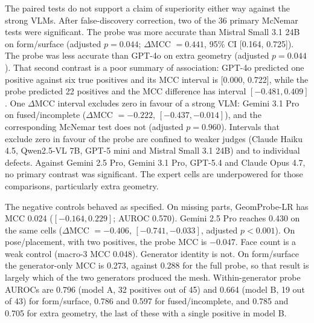 The paired tests do not support a claim of superiority either way against the strong VLMs.
After false-discovery correction, two of the 36 primary McNemar tests were significant.
The probe was more accurate than Mistral Small 3.1 24B on form/surface (adjusted \(p = 0.044\); \(\Delta\)MCC \(= 0.441\), 95\% CI [0.164, 0.725]).
The probe was less accurate than GPT-4o on extra geometry (adjusted \(p = 0.044\)).
That second contrast is a poor summary of association: GPT-4o predicted one positive against six true positives and its MCC interval is [0.000, 0.722], while the probe predicted 22 positives and the MCC difference has interval \([-0.481, 0.409]\).
One \(\Delta\)MCC interval excludes zero in favour of a strong VLM: Gemini 3.1 Pro on fused/incomplete (\(\Delta\)MCC \(= -0.222\), \([-0.437, -0.014]\)), and the corresponding McNemar test does not (adjusted \(p = 0.960\)).
Intervals that exclude zero in favour of the probe are confined to weaker judges (Claude Haiku 4.5, Qwen2.5-VL 7B, GPT-5 mini and Mistral Small 3.1 24B) and to individual defects.
Against Gemini 2.5 Pro, Gemini 3.1 Pro, GPT-5.4 and Claude Opus 4.7, no primary contrast was significant.
The expert cells are underpowered for those comparisons, particularly extra geometry.

The negative controls behaved as specified.
On missing parts, GeomProbe-LR has MCC 0.024 (\([-0.164, 0.229]\); AUROC 0.570).
Gemini 2.5 Pro reaches 0.430 on the same cells (\(\Delta\)MCC \(= -0.406\), \([-0.741, -0.033]\), adjusted \(p < 0.001\)).
On pose/placement, with two positives, the probe MCC is \(-0.047\).
Face count is a weak control (macro-3 MCC 0.048).
Generator identity is not.
On form/surface the generator-only MCC is 0.273, against 0.288 for the full probe, so that result is largely which of the two generators produced the mesh.
Within-generator probe AUROCs are 0.796 (model A, 32 positives out of 45) and 0.664 (model B, 19 out of 43) for form/surface, 0.786 and 0.597 for fused/incomplete, and 0.785 and 0.705 for extra geometry, the last of these with a single positive in model B.

